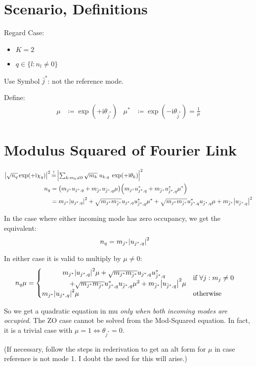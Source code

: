 \documentclass[
	english,
	a4paper,
	fontsize=10pt,
	parskip=half,
	titlepage=true,
	DIV=12,
	final
]{scrreprt}
\newcommand*{\iunit}{\ensuremath{\mathrm{i}}}
\newcommand*{\equalCond}{  \mathop{=}\limits^!  }
\begin{document}
\section{Scenario, Definitions}
Regard Case:
\begin{itemize}
\item $K = 2$
\item $q \in \{l : n_l \neq 0\}$
\end{itemize}

Use Symbol $\bar{j}^*$: not the reference mode.

Define:
\begin{align}
	\mu
&\coloneqq
	\exp(+\iunit \theta_{\bar{j}^*})
&
	\mu^*
&\coloneqq
	\exp(-\iunit \theta_{\bar{j}^*})
=
	\frac{1}{\mu}
\end{align}

\section{Modulus Squared of Fourier Link}
\begin{align}
	\abs{
		\sqrt{n_q} \exp(+\iunit \chi_q)
	}^2
&\equalCond
	\abs{
		\textstyle \sum_{k : m_k \neq 0}
			\sqrt{m_k} \; u_{k,q} \; \exp(+\iunit\theta_k)
	}^2
\\
	n_q
&=
	\qty(
		m_{     j ^*} u_{     j ^*, q} +
		m_{\bar{j}^*} u_{\bar{j}^*, q} \mu
	)	
	\qty(
		m_{     j ^*} u_{     j ^*, q}^* +
		m_{\bar{j}^*} u_{\bar{j}^*, q}^* \mu^*
	) \\
&=
	  m_{j^*} \abs{u_{j^*, q}}^2
	+ \sqrt{m_{j^*} m_{\bar{j}^*}} u_{j^*, q}   u_{\bar{j}^*, q}^* \mu^*
	+ \sqrt{m_{j^*} m_{\bar{j}^*}} u_{j^*, q}^* u_{\bar{j}^*, q}   \mu
	+ m_{\bar{j}^*} \abs{u_{\bar{j}^*, q}}^2
\end{align}

In the case where either incoming mode has zero occupancy, we get the equivalent:
\begin{align}
	n_q
&=
	m_{j^*} \abs{u_{j^*, q}}^2
\end{align}

In either case it is valid to multiply by $\mu \neq 0$:
\begin{align}
	n_q \mu
&=
	\begin{cases}
		\mqty{
			  m_{j^*} \abs{u_{j^*, q}}^2 \mu
			+ \sqrt{m_{j^*} m_{\bar{j}^*}} u_{j^*, q}   u_{\bar{j}^*, q}^*
			\\
			\qquad\qquad
			+ \sqrt{m_{j^*} m_{\bar{j}^*}} u_{j^*, q}^* u_{\bar{j}^*, q}   \mu^2
			+ m_{\bar{j}^*} \abs{u_{\bar{j}^*, q}}^2                       \mu
		}
		&
		\text{if } \forall j : m_j \neq 0
	\\
		m_{j^*} \abs{u_{j^*, q}}^2 \mu
		&
		\text{otherwise}
	\end{cases}
\end{align}

So we get a quadratic equation in mu \emph{only when both incoming modes are occupied}. The ZO case cannot be solved from the Mod-Squared equation. In fact, it is a trivial case with $\mu = 1 \Leftrightarrow \theta_{j^*} = 0$.

{\color{blue} (If necessary, follow the steps in rederivation to get an alt form for $\mu$ in case reference is not mode 1. I doubt the need for this will arise.)}
\end{document}
